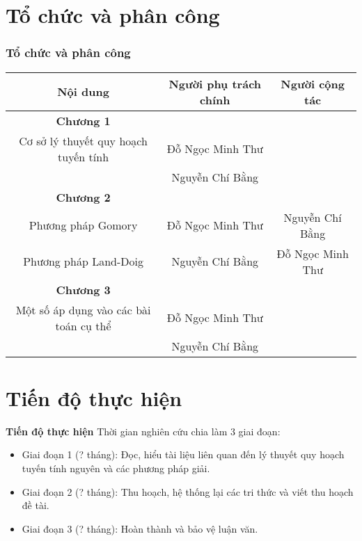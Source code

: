 \documentclass{beamer}
\begin{document}
\section{Tổ chức và phân công}
\begin{frame}[shrink=20]
    \frametitle{\bf Tổ chức và phân công}
    \vspace{1.5cm}
    \begin{table}
        \begin{tabular}{|c|c|c|}
            \hline
            Nội dung & Người phụ trách chính & Người cộng tác \\
            \hline \hline
            \textbf{Chương 1} && \\
            \hline
            Cơ sở lý thuyết quy hoạch tuyến tính & Đỗ Ngọc Minh Thư & \\
            & Nguyễn Chí Bằng & \\
            \hline
            \textbf{Chương 2} && \\
            \hline
            Phương pháp Gomory & Đỗ Ngọc Minh Thư & Nguyễn Chí Bằng \\
            Phương pháp Land-Doig & Nguyễn Chí Bằng & Đỗ Ngọc Minh Thư \\
            \hline
            \textbf{Chương 3} && \\
            \hline
            Một số áp dụng vào các bài
            toán cụ thể & Đỗ Ngọc Minh Thư & \\
            & Nguyễn Chí Bằng & \\
            \hline
        \end{tabular}
    \end{table}
\end{frame}
\section{Tiến độ thực hiện}
\begin{frame}{\bf Tiến độ thực hiện}
Thời gian nghiên cứu chia làm 3 giai đoạn:
\begin{itemize}
\item Giai đoạn 1 (? tháng): Đọc, hiểu tài liệu liên quan đến lý thuyết quy hoạch tuyến tính nguyên và các phương pháp giải.
\item Giai đoạn 2 (? tháng): Thu hoạch, hệ thống lại các tri thức và viết thu hoạch đề tài.
\item Giai đoạn 3 (? tháng): Hoàn thành và bảo vệ luận văn.
\end{itemize}
\end{frame}
\end{document}
